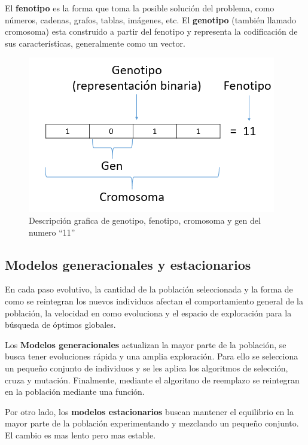 El \textbf{fenotipo} es la forma que toma la posible solución del problema, como números, cadenas, grafos, tablas, imágenes, etc. El \textbf{genotipo} (también llamado cromosoma) esta construido a partir del fenotipo y representa la codificación de sus características, generalmente como un vector.

\begin{figure}[H]
	\centering
	\includegraphics[width=0.75\linewidth]{img/fen_gen.png}
	\caption{Descripción grafica de genotipo, fenotipo, cromosoma y gen del numero ``11''}
	\label{fig:fen_gen}
\end{figure}

\subsection{Modelos generacionales y estacionarios}

En cada paso evolutivo, la cantidad de la población seleccionada y la forma de como se reintegran los nuevos individuos afectan el comportamiento general de la población, la velocidad en como evoluciona y el espacio de exploración para la búsqueda de óptimos globales.

Los \textbf{Modelos generacionales} actualizan la mayor parte de la población, se busca tener evoluciones rápida y una amplia exploración. Para ello se selecciona un pequeño conjunto de individuos y se les aplica los algoritmos de selección, cruza y mutación. Finalmente, mediante el algoritmo de reemplazo se reintegran en la población mediante una función.	

Por otro lado, los \textbf{modelos estacionarios} buscan mantener el equilibrio en la mayor parte de la población experimentando y mezclando un pequeño conjunto.  El cambio es mas lento pero mas estable.